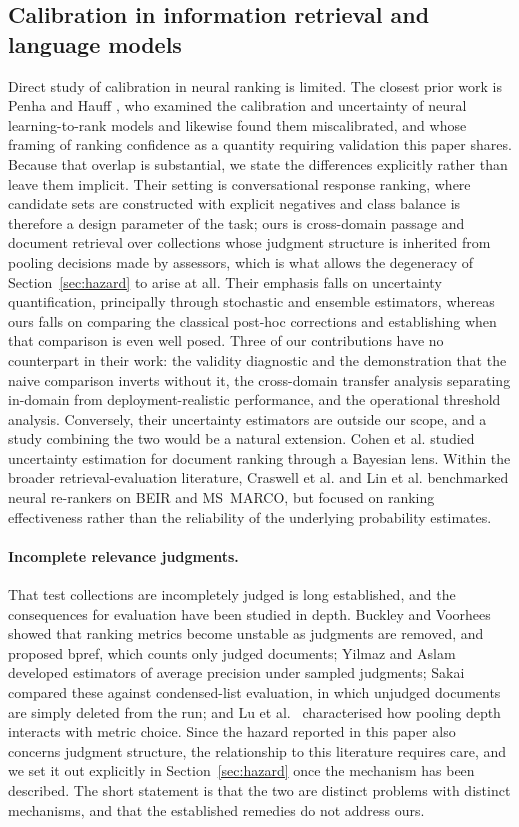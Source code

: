 \documentclass[sn-mathphys-num,pdflatex]{sn-jnl}
\begin{document}
\subsection{Calibration in information retrieval and language
models}\label{sec:rw-recent}
Direct study of calibration in neural ranking is limited. The closest prior work is
Penha and Hauff \cite{penha2021}, who examined the calibration and uncertainty of
neural learning-to-rank models and likewise found them miscalibrated, and whose
framing of ranking confidence as a quantity requiring validation this paper shares.
Because that overlap is substantial, we state the differences explicitly rather
than leave them implicit. Their setting is conversational response ranking, where
candidate sets are constructed with explicit negatives and class balance is
therefore a design parameter of the task; ours is cross-domain passage and document
retrieval over collections whose judgment structure is inherited from pooling
decisions made by assessors, which is what allows the degeneracy of
Section~\ref{sec:hazard} to arise at all. Their emphasis falls on uncertainty
quantification, principally through stochastic and ensemble estimators, whereas
ours falls on comparing the classical post-hoc corrections and establishing when
that comparison is even well posed. Three of our contributions have no counterpart
in their work: the validity diagnostic and the demonstration that the naive
comparison inverts without it, the cross-domain transfer analysis separating
in-domain from deployment-realistic performance, and the operational threshold
analysis. Conversely, their uncertainty estimators are outside our scope, and a
study combining the two would be a natural extension. Cohen et al.
\cite{cohen2021} studied uncertainty estimation for document ranking through a
Bayesian lens. Within the broader retrieval-evaluation literature, Craswell et
al. \cite{craswell2020} and Lin et al. \cite{lin2021pyserini} benchmarked neural
re-rankers on BEIR and MS~MARCO, but focused on ranking effectiveness rather than
the reliability of the underlying probability estimates.

\paragraph{Incomplete relevance judgments.}
That test collections are incompletely judged is long established, and the
consequences for evaluation have been studied in depth. Buckley and Voorhees
\cite{buckley2004} showed that ranking metrics become unstable as judgments are
removed, and proposed bpref, which counts only judged documents; Yilmaz and Aslam
\cite{yilmaz2006} developed estimators of average precision under sampled
judgments; Sakai \cite{sakai2007} compared these against condensed-list
evaluation, in which unjudged documents are simply deleted from the run; and Lu et
al.\ \cite{lu2016} characterised how pooling depth interacts with metric choice.
Since the hazard reported in this paper also concerns judgment structure, the
relationship to this literature requires care, and we set it out explicitly in
Section~\ref{sec:hazard} once the mechanism has been described. The short statement
is that the two are distinct problems with distinct mechanisms, and that the
established remedies do not address ours.
\end{document}
